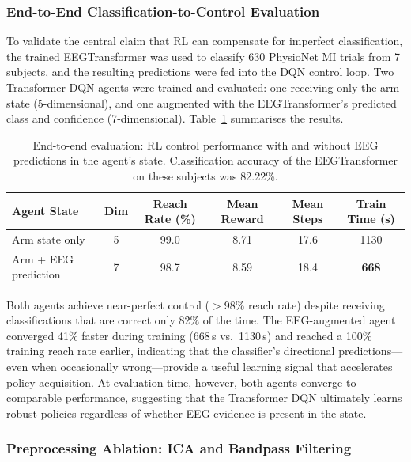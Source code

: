 \documentclass[12pt, a4paper]{article}
\begin{document}
\subsubsection{End-to-End Classification-to-Control Evaluation}
\label{sec:e2e_results}

To validate the central claim that RL can compensate for imperfect classification, the trained EEGTransformer was used to classify 630 PhysioNet MI trials from 7 subjects, and the resulting predictions were fed into the DQN control loop. Two Transformer DQN agents were trained and evaluated: one receiving only the arm state (5-dimensional), and one augmented with the EEGTransformer's predicted class and confidence (7-dimensional). Table~\ref{tab:e2e_eval} summarises the results.

\begin{table}[htbp]
\centering
\caption{End-to-end evaluation: RL control performance with and without EEG predictions in the agent's state. Classification accuracy of the EEGTransformer on these subjects was 82.22\%.}
\label{tab:e2e_eval}
\begin{tabular}{lccccc}
\toprule
\textbf{Agent State} & \textbf{Dim} & \textbf{Reach Rate (\%)} & \textbf{Mean Reward} & \textbf{Mean Steps} & \textbf{Train Time (s)} \\
\midrule
Arm state only     & 5 & 99.0 & 8.71 & 17.6 & 1130 \\
Arm + EEG prediction & 7 & 98.7 & 8.59 & 18.4 & \textbf{668} \\
\bottomrule
\end{tabular}
\end{table}

Both agents achieve near-perfect control ($>$98\% reach rate) despite receiving classifications that are correct only 82\% of the time. The EEG-augmented agent converged 41\% faster during training (668\,s vs.\ 1130\,s) and reached a 100\% training reach rate earlier, indicating that the classifier's directional predictions---even when occasionally wrong---provide a useful learning signal that accelerates policy acquisition. At evaluation time, however, both agents converge to comparable performance, suggesting that the Transformer DQN ultimately learns robust policies regardless of whether EEG evidence is present in the state.

\subsubsection{Preprocessing Ablation: ICA and Bandpass Filtering}
\label{sec:ica_results}
\label{sec:res_preproc}
\end{document}
